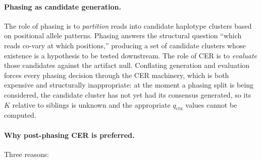 \documentclass[11pt]{article}
\begin{document}
\paragraph{Phasing as candidate generation.} The role of phasing is to
\emph{partition} reads into candidate haplotype clusters based on positional
allele patterns. Phasing answers the structural question ``which reads
co-vary at which positions,'' producing a set of candidate clusters whose
existence is a hypothesis to be tested downstream. The role of CER is to
\emph{evaluate} those candidates against the artifact null. Conflating
generation and evaluation forces every phasing decision through the CER
machinery, which is both expensive and structurally inappropriate: at the
moment a phasing split is being considered, the candidate cluster has not
yet had its consensus generated, so its $K$ relative to siblings is unknown
and the appropriate $q_\text{ctx}$ values cannot be computed.

\paragraph{Why post-phasing CER is preferred.} Three reasons:
\end{document}
